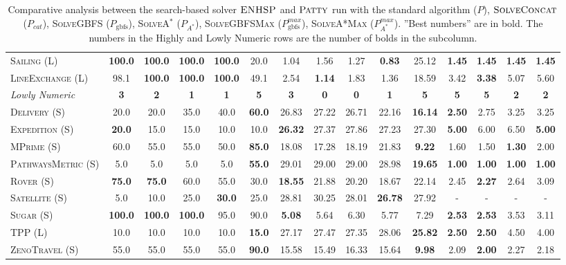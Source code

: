 \documentclass[11pt,landscape]{article}
\begin{document}
\begin{table*}[tb]
{\begin{tabular}{|l||ccccc||ccccc||cccc||}
\textsc{Sailing} (L)&\textbf{100.0}&\textbf{100.0}&\textbf{100.0}&\textbf{100.0}&20.0&1.04&1.56&1.27&\textbf{0.83}&25.12&\textbf{1.45}&\textbf{1.45}&\textbf{1.45}&\textbf{1.45}\\
\textsc{LineExchange} (L)&98.1&\textbf{100.0}&\textbf{100.0}&\textbf{100.0}&49.1&2.54&\textbf{1.14}&1.83&1.36&18.59&3.42&\textbf{3.38}&5.07&5.60
\\\hline
\textit{Lowly Numeric}&\textbf{3}&\textbf{2}&\textbf{1}&\textbf{1}&\textbf{5}&\textbf{3}&\textbf{0}&\textbf{0}&\textbf{1}&\textbf{5}&\textbf{5}&\textbf{5}&\textbf{2}&\textbf{2}\\\hline
\textsc{Delivery} (S)&20.0&20.0&35.0&40.0&\textbf{60.0}&26.83&27.22&26.71&22.16&\textbf{16.14}&\textbf{2.50}&2.75&3.25&3.25\\
\textsc{Expedition} (S)&\textbf{20.0}&15.0&15.0&10.0&10.0&\textbf{26.32}&27.37&27.86&27.23&27.30&\textbf{5.00}&6.00&6.50&\textbf{5.00}\\
\textsc{MPrime} (S)&60.0&55.0&55.0&50.0&\textbf{85.0}&18.08&17.28&18.19&21.83&\textbf{9.22}&1.60&1.50&\textbf{1.30}&2.00\\
\textsc{PathwaysMetric} (S)&5.0&5.0&5.0&5.0&\textbf{55.0}&29.01&29.00&29.00&28.98&\textbf{19.65}&\textbf{1.00}&\textbf{1.00}&\textbf{1.00}&\textbf{1.00}\\
\textsc{Rover} (S)&\textbf{75.0}&\textbf{75.0}&60.0&55.0&30.0&\textbf{18.55}&21.88&20.20&18.67&22.14&2.45&\textbf{2.27}&2.64&3.09\\
\textsc{Satellite} (S)&5.0&10.0&25.0&\textbf{30.0}&25.0&28.81&30.25&28.01&\textbf{26.78}&27.92&-&-&-&-\\
\textsc{Sugar} (S)&\textbf{100.0}&\textbf{100.0}&\textbf{100.0}&95.0&90.0&\textbf{5.08}&5.64&6.30&5.77&7.29&\textbf{2.53}&\textbf{2.53}&3.53&3.11\\
\textsc{TPP} (L)&10.0&10.0&10.0&10.0&\textbf{15.0}&27.17&27.47&27.35&28.06&\textbf{25.82}&\textbf{2.50}&\textbf{2.50}&4.50&4.00\\
\textsc{ZenoTravel} (S)&55.0&55.0&55.0&55.0&\textbf{90.0}&15.58&15.49&16.33&15.64&\textbf{9.98}&2.09&\textbf{2.00}&2.27&2.18
\\\hline

        \end{tabular}}
        \caption{Comparative analysis between the search-based solver $\textsc{ENHSP}$ and  $\textsc{Patty}$ run with the standard algorithm ($P$),  $\textsc{SolveConcat}$ ($P_{cat}$), \textsc{SolveGBFS} ($P_\text{gbfs}$), \textsc{SolveA}$^*$ ($P_{A^*}$), \textsc{SolveGBFSMax} ($P_\text{gbfs}^{max}$), \textsc{SolveA*Max} ($P_{A^*}^{max}$). ''Best numbers'' are in bold.  The numbers in the Highly and Lowly Numeric rows are the number of bolds in the subcolumn.}
        \label{tab:experiments}
        \end{table*}
        
\end{document}
